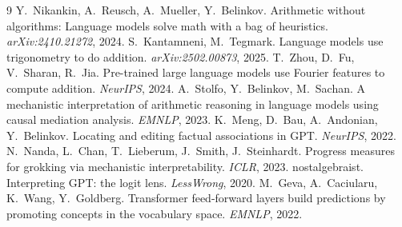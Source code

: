 \documentclass[11pt]{article}
\begin{document}
\begin{thebibliography}{9}
 Y.~Nikankin, A.~Reusch, A.~Mueller, Y.~Belinkov. Arithmetic without algorithms: Language models solve math with a bag of heuristics. \emph{arXiv:2410.21272}, 2024.
 S.~Kantamneni, M.~Tegmark. Language models use trigonometry to do addition. \emph{arXiv:2502.00873}, 2025.
 T.~Zhou, D.~Fu, V.~Sharan, R.~Jia. Pre-trained large language models use Fourier features to compute addition. \emph{NeurIPS}, 2024.
 A.~Stolfo, Y.~Belinkov, M.~Sachan. A mechanistic interpretation of arithmetic reasoning in language models using causal mediation analysis. \emph{EMNLP}, 2023.
 K.~Meng, D.~Bau, A.~Andonian, Y.~Belinkov. Locating and editing factual associations in GPT. \emph{NeurIPS}, 2022.
 N.~Nanda, L.~Chan, T.~Lieberum, J.~Smith, J.~Steinhardt. Progress measures for grokking via mechanistic interpretability. \emph{ICLR}, 2023.
 nostalgebraist. Interpreting GPT: the logit lens. \emph{LessWrong}, 2020.
 M.~Geva, A.~Caciularu, K.~Wang, Y.~Goldberg. Transformer feed-forward layers build predictions by promoting concepts in the vocabulary space. \emph{EMNLP}, 2022.
\end{thebibliography}
\end{document}
